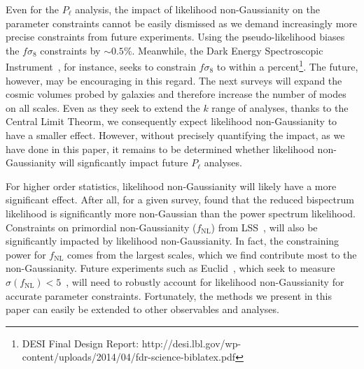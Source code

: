 \documentclass[12pt, letterpaper, preprint]{aastex}
\newcommand{\todo}[1]{{\bf \textcolor{red}{#1}}}
\begin{document}
Even for the $P_\ell$ analysis, the impact of likelihood non-Gaussianity 
on the parameter constraints cannot be easily dismissed as we demand 
increasingly more precise constraints from future experiments. Using the 
pseudo-likelihood biases the $f\sigma_8$ constraints by $\sim 0.5\%$. 
Meanwhile, the Dark Energy Spectroscopic Instrument~\citep[DESI;][]{levi2013}, 
for instance, seeks to constrain $f\sigma_8$ to within a 
percent\footnote{DESI Final Design Report: http://desi.lbl.gov/wp-content/uploads/2014/04/fdr-science-biblatex.pdf}. 
The future, however, may be encouraging in this regard. The next surveys 
will expand the cosmic volumes probed by galaxies and therefore increase 
the number of modes on all scales. Even as they seek to extend the $k$ 
range of analyses, thanks to the Central Limit Theorm, we consequently expect 
likelihood non-Gaussianity to have a smaller effect. However, without 
precisely quantifying the impact, as we have done in this paper, it 
remains to be determined whether likelihood non-Gaussianity will signficantly 
impact future $P_\ell$ analyses.  

For higher order statistics, likelihood non-Gaussianity will likely 
have a more significant effect. After all, for a given survey, \cite{scoccimarro2000} 
found that the reduced bispectrum likelihood is significantly more 
non-Gaussian than the power spectrum likelihood. Constraints on primordial 
non-Gaussianity ($f_\mathrm{NL}$) from LSS~\citep[\emph{e.g.}][]{dalal2008, slosar2008, ross2013, giannantonio2014}, 
will also be significantly impacted by likelihood non-Gaussianity. 
In fact, the constraining power for $f_\mathrm{NL}$ comes from the 
largest scales, which we find contribute most to the non-Gaussianity. 
Future experiments such as Euclid~\citep{amendola2016}, which seek 
to measure $\sigma(f_\mathrm{NL}) < 5$~\citep{giannantonio2012, amendola2016}, 
will need to robustly account for likelihood non-Gaussianity for 
accurate parameter constraints. Fortunately, the methods we present 
in this paper can easily be extended to other observables and analyses. 

\end{document}
